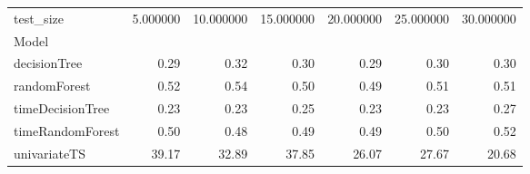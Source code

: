 \begin{tabular}{lrrrrrr}
\toprule
test_size & 5.000000 & 10.000000 & 15.000000 & 20.000000 & 25.000000 & 30.000000 \\
Model &  &  &  &  &  &  \\
\midrule
decisionTree & 0.29 & 0.32 & 0.30 & 0.29 & 0.30 & 0.30 \\
randomForest & 0.52 & 0.54 & 0.50 & 0.49 & 0.51 & 0.51 \\
timeDecisionTree & 0.23 & 0.23 & 0.25 & 0.23 & 0.23 & 0.27 \\
timeRandomForest & 0.50 & 0.48 & 0.49 & 0.49 & 0.50 & 0.52 \\
univariateTS & 39.17 & 32.89 & 37.85 & 26.07 & 27.67 & 20.68 \\
\bottomrule
\end{tabular}
